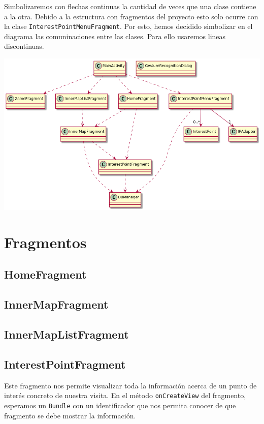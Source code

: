 \documentclass[11pt]{article}
\begin{document}
Simbolizaremos con flechas continuas la cantidad de veces que una clase contiene a la otra. Debido a la estructura con fragmentos del proyecto esto solo ocurre con la clase \texttt{InterestPointMenuFragment}. Por esto, hemos decidido simbolizar en el diagrama las comuninaciones entre las clases. Para ello usaremos lineas discontinuas.

\begin{center}
\includegraphics[width=.9\linewidth]{./diagrama2.png}
\end{center}


\section{Fragmentos}
\label{sec:org56ff517}
\subsection{HomeFragment}
\label{sec:orga43117f}

\subsection{InnerMapFragment}
\label{sec:org2fe53a6}

\subsection{InnerMapListFragment}
\label{sec:org41d83db}

\subsection{InterestPointFragment}
\label{sec:org6bb48d4}

Este fragmento nos permite visualizar toda la información acerca de un punto de interés concreto de nuestra visita. 
En el método \texttt{onCreateView} del fragmento, esperamos un \texttt{Bundle} con un identificador que nos permita conocer de que fragmento se debe mostrar la información.
\end{document}
